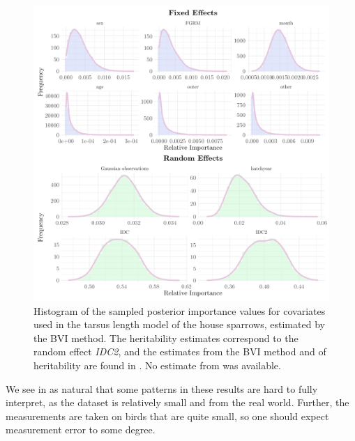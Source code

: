 \begin{figure}[H]
  \centering
  \includegraphics[width=1\linewidth]{Figures/House sparrow study/Tarsus_ccd.png}
  \caption[Estimated posterior importance of all covariates in the tarsus length model from the BVI method]{Histogram of the sampled posterior importance values for covariates used in the tarsus length model of the house sparrows, estimated by the BVI method. The heritability estimates correspond to the random effect \textit{IDC2}, and the estimates from the BVI method and \citet{Silva2017} of heritability are found in . No estimate from \citet{Muff2019Genetic} was available.}
  \label{fig:heritability_tarsus_combined}
\end{figure}
\noindent We see in as natural that some patterns in these results are hard to fully interpret, as the dataset is relatively small and from the real world. Further, the measurements are taken on birds that are quite small, so one should expect measurement error to some degree.

